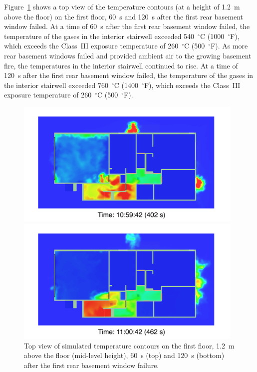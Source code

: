 \documentclass[12pt,oneside]{book}
\begin{document}
Figure~\ref{fig:smv_flow_path_top_2} shows a top view of the temperature contours (at a height of 1.2~m above the floor) on the first floor, 60~s and 120~s after the first rear basement window failed. At a time of 60~s after the first rear basement window failed, the temperature of the gases in the interior stairwell exceeded 540~$^{\circ}$C (1000~$^{\circ}$F), which exceeds the Class~III exposure temperature of 260~$^{\circ}$C (500~$^{\circ}$F). As more rear basement windows failed and provided ambient air to the growing basement fire, the temperatures in the interior stairwell continued to rise. At a time of 120~s after the first rear basement window failed, the temperature of the gases in the interior stairwell exceeded 760~$^{\circ}$C (1400~$^{\circ}$F), which exceeds the Class~III exposure temperature of 260~$^{\circ}$C (500~$^{\circ}$F).


\clearpage


\begin{figure}[!ht]
\includegraphics[width=4.3in]{../Figures/SMV_Top_Temp_402_s}


\includegraphics[width=4.3in]{../Figures/SMV_Top_Temp_462_s}


\caption[Simulated temperature contours on the first floor after basement window failure.]
{Top view of simulated temperature contours on the first floor, 1.2~m above the floor (mid-level height), 60~s (top) and 120~s (bottom) after the first rear basement window failure.}
\label{fig:smv_flow_path_top_2}
\end{figure}
\end{document}
